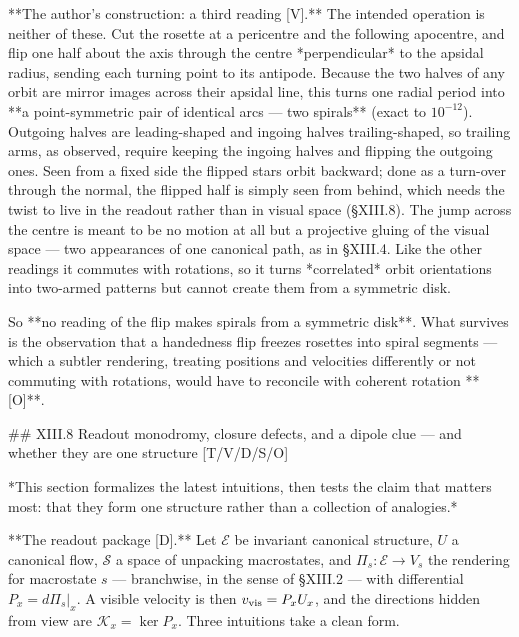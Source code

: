**The author's construction: a third reading [V].** The intended operation is neither of these. Cut the rosette at a pericentre and the following apocentre, and flip one half about the axis through the centre *perpendicular* to the apsidal radius, sending each turning point to its antipode. Because the two halves of any orbit are mirror images across their apsidal line, this turns one radial period into **a point-symmetric pair of identical arcs — two spirals** (exact to $10^{-12}$). Outgoing halves are leading-shaped and ingoing halves trailing-shaped, so trailing arms, as observed, require keeping the ingoing halves and flipping the outgoing ones. Seen from a fixed side the flipped stars orbit backward; done as a turn-over through the normal, the flipped half is simply seen from behind, which needs the twist to live in the readout rather than in visual space (§XIII.8). The jump across the centre is meant to be no motion at all but a projective gluing of the visual space — two appearances of one canonical path, as in §XIII.4. Like the other readings it commutes with rotations, so it turns *correlated* orbit orientations into two-armed patterns but cannot create them from a symmetric disk.

So **no reading of the flip makes spirals from a symmetric disk**. What survives is the observation that a handedness flip freezes rosettes into spiral segments — which a subtler rendering, treating positions and velocities differently or not commuting with rotations, would have to reconcile with coherent rotation **[O]**.

## XIII.8 Readout monodromy, closure defects, and a dipole clue — and whether they are one structure [T/V/D/S/O]

*This section formalizes the latest intuitions, then tests the claim that matters most: that they form one structure rather than a collection of analogies.*

**The readout package [D].** Let $\mathscr E$ be invariant canonical structure, $U$ a canonical flow, $\mathscr S$ a space of unpacking macrostates, and $\Pi_s:\mathscr E\to V_s$ the rendering for macrostate $s$ — branchwise, in the sense of §XIII.2 — with differential $P_x = d\Pi_s|_x$. A visible velocity is then $v_{\rm vis} = P_xU_x$, and the directions hidden from view are $\mathcal K_x = \ker P_x$. Three intuitions take a clean form.

